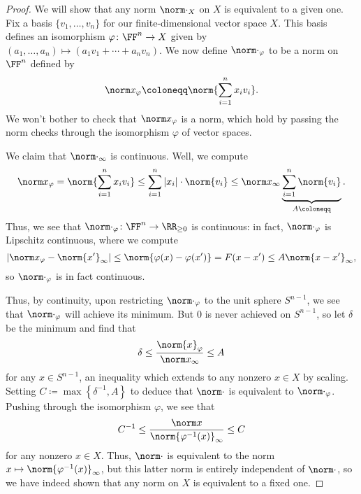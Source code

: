 \documentclass[../notes.tex]{subfiles}
\begin{document}
\begin{proof}
	We will show that any norm $\norm\cdot_X$ on $X$ is equivalent to a given one. Fix a basis $\{v_1,\ldots,v_n\}$ for our finite-dimensional vector space $X$. This basis defines an isomorphism $\varphi\colon\FF^n\to X$ given by $(a_1,\ldots,a_n)\mapsto(a_1v_1+\cdots+a_nv_n)$. We now define $\norm\cdot_\varphi$ to be a norm on $\FF^n$ defined by
	\[\norm x_\varphi\coloneqq\norm{\sum_{i=1}^nx_iv_i}.\]
	We won't bother to check that $\norm x_\varphi$ is a norm, which hold by passing the norm checks through the isomorphism $\varphi$ of vector spaces.

	We claim that $\norm\cdot_\infty$ is continuous. Well, we compute
	\[\norm x_\varphi=\norm{\sum_{i=1}^nx_iv_i}\le\sum_{i=1}^n\left|x_i\right|\cdot\norm{v_i}\le\norm x_\infty\underbrace{\sum_{i=1}^n\norm{v_i}}_{A\coloneqq}.\]
	Thus, we see that $\norm\cdot_\varphi\colon\FF^n\to\RR_{\ge0}$ is continuous: in fact, $\norm\cdot_\varphi$ is Lipschitz continuous, where we compute
	\[\left|\norm x_\varphi-\norm{x'}_\infty\right|\le\norm{\varphi(x)-\varphi(x')}=F(x-x')\le A\norm{x-x'}_\infty,\]
	so $\norm\cdot_\varphi$ is in fact continuous.

	Thus, by continuity, upon restricting $\norm\cdot_\varphi$ to the unit sphere $S^{n-1}$, we see that $\norm\cdot_\varphi$ will achieve its minimum. But $0$ is never achieved on $S^{n-1}$, so let $\delta$ be the minimum and find that
	\[\delta\le\frac{\norm{x}_\varphi}{\norm x_\infty}\le A\]
	for any $x\in S^{n-1}$, an inequality which extends to any nonzero $x\in X$ by scaling. Setting $C\coloneqq\max\left\{\delta^{-1},A\right\}$ to deduce that $\norm\cdot$ is equivalent to $\norm\cdot_\varphi$. Pushing through the isomorphism $\varphi$, we see that
	\[C^{-1}\le\frac{\norm x}{\norm{\varphi^{-1}(x)}_\infty}\le C\]
	for any nonzero $x\in X$. Thus, $\norm\cdot$ is equivalent to the norm $x\mapsto\norm{\varphi^{-1}(x)}_\infty$, but this latter norm is entirely independent of $\norm\cdot$, so we have indeed shown that any norm on $X$ is equivalent to a fixed one.
\end{proof}
\end{document}
